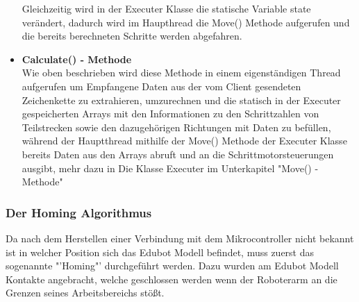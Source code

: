 \begin{itemize}
Gleichzeitig wird in der Executer Klasse die statische Variable state verändert, dadurch wird im Haupthread die Move() Methode aufgerufen und die bereits berechneten Schritte werden abgefahren.

\item \textbf{Calculate() - Methode}\\
Wie oben beschrieben wird diese Methode in einem eigenständigen Thread aufgerufen um Empfangene Daten aus der vom Client gesendeten Zeichenkette zu extrahieren, umzurechnen und die statisch in der Executer gespeicherten Arrays mit den Informationen zu den Schrittzahlen von Teilstrecken sowie den dazugehörigen Richtungen mit Daten zu befüllen, während der Hauptthread mithilfe der Move() Methode der Executer Klasse bereits Daten aus den Arrays abruft und an die Schrittmotorsteuerungen ausgibt, mehr dazu in Die Klasse Executer im Unterkapitel "Move() - Methode"
\end{itemize}
\subsubsection{Der Homing Algorithmus}
Da nach dem Herstellen einer Verbindung mit dem Mikrocontroller nicht bekannt ist in welcher Position sich das Edubot Modell befindet, muss zuerst das sogenannte "'Homing"' durchgeführt werden. Dazu wurden am Edubot Modell Kontakte angebracht, welche geschlossen werden wenn der Roboterarm an die Grenzen seines Arbeitsbereichs stößt. 
